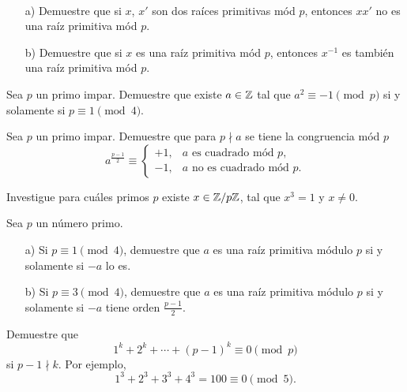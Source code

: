 \documentclass{article}
\begin{document}
\begin{problema}
  ~

  \begin{enumerate}
  \item[a)] Demuestre que si $x$, $x'$ son dos raíces primitivas mód $p$,
    entonces $x x'$ no es una raíz primitiva mód $p$.

  \item[b)] Demuestre que si $x$ es una raíz primitiva mód $p$, entonces
    $x^{-1}$ es también una raíz primitiva mód $p$.
  \end{enumerate}
\end{problema}

\begin{problema}
  Sea $p$ un primo impar. Demuestre que existe $a \in \mathbb{Z}$ tal que
  $a^2 \equiv -1 \pmod{p}$ si y solamente si $p \equiv 1 \pmod{4}$.
\end{problema}

\begin{problema}[Euler]
  Sea $p$ un primo impar. Demuestre que para $p \nmid a$ se tiene
  la congruencia mód $p$
  \[ a^{\frac{p-1}{2}} \equiv
    \begin{cases}
      +1, & a \text{ es cuadrado mód }p, \\
      -1, & a \text{ no es cuadrado mód }p.
    \end{cases} \]
\end{problema}

\begin{problema}
  Investigue para cuáles primos $p$ existe $x \in \mathbb{Z}/p\mathbb{Z}$, tal que $x^3 = 1$ y
  $x \ne 0$.
\end{problema}

\begin{problema}
  Sea $p$ un número primo.

  \begin{enumerate}
  \item[a)] Si $p \equiv 1 \pmod{4}$, demuestre que $a$ es una raíz primitiva
    módulo $p$ si y solamente si $-a$ lo es.

  \item[b)] Si $p \equiv 3 \pmod{4}$, demuestre que $a$ es una raíz primitiva
    módulo $p$ si y solamente si $-a$ tiene orden $\frac{p-1}{2}$.
  \end{enumerate}
\end{problema}

\begin{problema}
  Demuestre que
  $$1^k + 2^k + \cdots + (p-1)^k \equiv 0 \pmod{p}$$
  si $p-1 \nmid k$. Por ejemplo,
  $$1^3 + 2^3 + 3^3 + 4^3 = 100 \equiv 0 \pmod{5}.$$
\end{problema}
\end{document}
